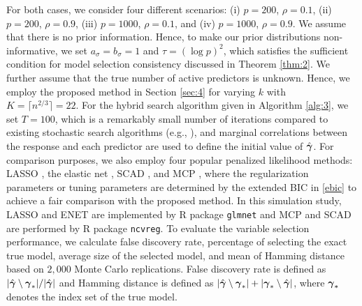 For both cases, we consider four different scenarios: (i) $p=200$, $\rho=0.1$, (ii) $p=200$, $\rho=0.9$, (iii) $p=1000$, $\rho=0.1$, and (iv) $p=1000$, $\rho=0.9$. We assume that there is no prior information. Hence, to make our prior distributions non-informative, we set $a_\sigma=b_\sigma=1$ and $\tau=(\log p)^2$, which satisfies the sufficient condition for model selection consistency discussed in Theorem \ref{thm:2}. We further assume that the true number of active predictors is unknown. Hence, we employ the proposed method in Section \ref{sec:4} for varying $k$ with $K=\lceil n^{2/3} \rceil =22$. For the hybrid search algorithm given in Algorithm \ref{alg:3}, we set $T=100$, which is a remarkably small number of iterations compared to existing stochastic search algorithms (e.g., \citealt{kirkpatrick1983optimization, george1993variable, hans2007shotgun}), and marginal correlations between the response and each predictor are used to define the initial value of $\hat{{\boldsymbol \gamma}}$. For comparison purposes, we also employ four popular penalized likelihood methods: LASSO \citep{tibshirani1996regression}, the elastic net \citep{zou2005regularization}, SCAD \citep{fan2001variable}, and MCP \citep{zhang2010nearly}, where the regularization parameters or tuning parameters are determined by the extended BIC in \eqref{ebic} to achieve a fair comparison with the proposed method. In this simulation study, LASSO and ENET are implemented by R package \texttt{glmnet} and  MCP and SCAD are performed by R package \texttt{ncvreg}. To evaluate the variable selection performance, we calculate false discovery rate, percentage of selecting the exact true model, average size of the selected model, and mean of Hamming distance based on $2,000$ Monte Carlo replications. False discovery rate is defined as $|\hat{{\boldsymbol \gamma}}\setminus {\boldsymbol \gamma}_*|/|\hat{{\boldsymbol \gamma}}|$ and Hamming distance is defined as $|\hat{{\boldsymbol \gamma}}\setminus {\boldsymbol \gamma}_* |+|{\boldsymbol \gamma}_* \setminus  \hat{{\boldsymbol \gamma}}|$, where ${\boldsymbol \gamma}_*$ denotes the index set of the true model.


